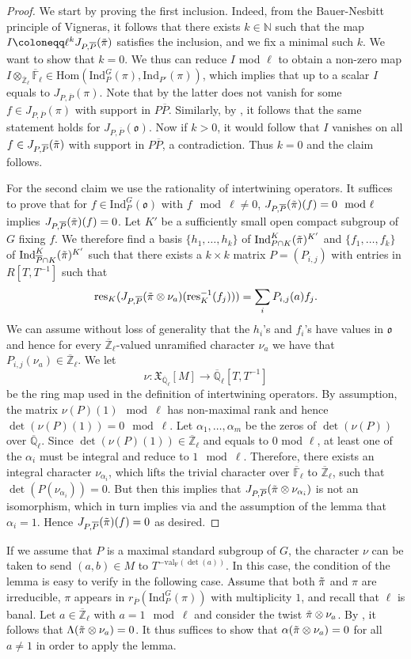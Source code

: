 \documentclass[10pt,a4paper]{article}
\theoremstyle{remark}
\theoremstyle{definition}
\newcommand{\fl}{{\overline{\mathbb{F}}_\ell}}
\newcommand{\ql}{{\overline{\mathbb{Q}}_\ell}}
\newcommand{\zl}{{\overline{\mathbb{Z}}_\ell}}
\newcommand{\ip}{\mathrm{Ind}_P^G}
\newcommand{\ho}{\mathrm{Hom}}
\newcommand{\bl}{\otimes_\zl\fl}
\newcommand{\op}{\overline{P}}
\newcommand{\id}{\mathrm{Ind}}
\newcommand{\xc}{\mathfrak{X}}
\newcommand{\res}{\mathrm{res}}
\newcommand{\fo}{\mathfrak{o}}
\newcommand{\ra}{\rightarrow}
\newcommand{\ipp}{\id_{P'}}
\newcommand{\tpi}{\Tilde{\pi}}
\newcommand{\FF}{\mathrm{F}}
\begin{document}
\begin{proof}
We start by proving the first inclusion. Indeed, from the Bauer-Nesbitt principle of Vigneras, it follows that there exists $k\in\mathbb{N}$ such that the map $I\coloneqq \ell^kJ_{P,\overline{P}}(\tpi)$ satisfies the inclusion, and we fix a minimal such $k$. We want to show that $k=0$. We thus can reduce $I$ mod $\ell$ to obtain a non-zero map $I\bl\in \ho(\ip(\pi),\ipp(\pi))$, which implies that up to a scalar $I$ equals to $J_{P,\overline{P}}(\pi)$. Note that by  the latter does not vanish for some $f\in J_{P,\overline{P}}(\pi)$ with support in $P\op$. Similarly, by , it follows that the same statement holds for $J_{P,\overline{P}}(\fo)$. Now if $k>0$, it would follow that $I$ vanishes on all $f\in J_{P,\overline{P}}(\tpi)$ with support in $P\op$, a contradiction. Thus $k=0$ and the claim follows.

For the second claim we use  the rationality of intertwining operators. It suffices to prove that for $f\in \ip(\fo)$ with $f\mod\ell\neq 0$, $J_{P,\overline{P}}(\tpi)(f)=0\mod \ell$ implies $J_{P,\op}(\tpi)(f)=0$. 
Let $K'$ be a sufficiently small open compact subgroup of $G$ fixing $f$.
We therefore find a basis $\{h_1,\ldots,h_k\}$ of $\id_{P\cap K}^K(\tpi)^{K'}$  and $\{f_1,\ldots,f_k\}$ of $\id_{\op\cap K}^K(\tpi)^{K'}$
such that there exists a $k\times k$ matrix $P=(P_{i,j})$ with entries in $R[T,T^{-1}]$ such that \[\res_K(J_{P,\op}(\tpi\otimes\nu_a)(\res_K^{-1}(f_j)))=\sum_iP_{i,j}(a)f_j.\]
We can assume without loss of generality that the $h_i$'s and $f_i$'s have values in $\fo$ and hence for every $\zl$-valued unramified character $\nu_a$ we have that $P_{i,j}(\nu_a)\in\zl$.
We let \[\nu\colon \xc_\ql[M]\ra \ql[T,T^{-1}]\] be the ring map used in the definition of intertwining operators.
 By assumption, the matrix $\nu(P)(1)\mod \ell$ has non-maximal rank and hence $\det(\nu(P)(1))=0\mod\ell$.
 Let $\alpha_1,\ldots,\alpha_m$ be the zeros of $\det(\nu(P))$ over $\ql$. Since $\det(\nu(P)(1))\in \zl$ and equals to $0$ mod $\ell$, at least one of the $\alpha_i$  must be integral and reduce to $1\mod \ell$.
 Therefore, there exists an integral character $\nu_{\alpha_i} $, which lifts the trivial character over $\fl$ to $\zl$, such that $\det(P(\nu_{\alpha_i}))=0$. But then this implies that $J_{P,\op}(\tpi\otimes\nu_{\alpha_i})$ is not an
  isomorphism, which in turn implies via  and the assumption of the lemma that $\alpha_i=1$.
  Hence $J_{P,\op}(\tpi)(f)=0$ as desired. 
\end{proof}
If we assume that $P$ is a maximal standard subgroup of $G$, the character $\nu$ can be taken to send $(a,b)\in M$ to $T^{-\mathrm{val}_\FF(\det(a))}$. In this case, the condition of the lemma is easy to verify in the following case.
Assume that both $\tpi$ and $\pi$ are irreducible, $\pi$ appears in $r_{\op}(\ip(\pi))$ with multiplicity $1$, and recall that $\ell$ is banal. Let $a\in\zl$ with $a=1\mod \ell$ and consider the twist $\tpi\otimes\nu_a$. By \cite[Lemma 7.2]{Dat05}, it follows that $\Lambda(\tpi\otimes\nu_a)=0$. It thus suffices to show that $\alpha(\tpi\otimes\nu_a)=0$ for all $a\neq 1$ in order to apply the lemma.
\end{document}
